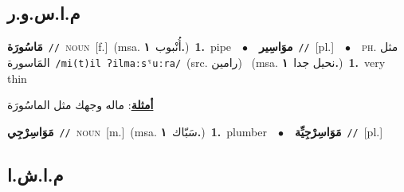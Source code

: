 \documentclass[10pt,a4paper,twoside]{article} %
\begin{document}
\begin{multicols}{2}
\vspace{-3mm}
\subsection*{\color{blue}\foreignlanguage{arabic}{م.ا.س.و.ر}\color{blue}{ (ntws)}} 

{\setlength\topsep{0pt}\textbf{\foreignlanguage{arabic}{مَاسُورَة}}\ {\color{gray}\texttt{//}\color{black}}\ \textsc{noun}\ [f.]\ \color{gray}(msa. \foreignlanguage{arabic}{أُنْبوب}~\foreignlanguage{arabic}{\textbf{١.}})\color{black}\ \textbf{1.}~pipe\ \ $\bullet$\ \ \setlength\topsep{0pt}\textbf{\foreignlanguage{arabic}{موَاسِير}}\ {\color{gray}\texttt{//}\color{black}}\ [pl.]\ \ $\bullet$\ \ \textsc{ph.} \color{gray} \foreignlanguage{arabic}{مثل المَاسورة}\color{black}\ {\color{gray}\texttt{/{\sffamily mi(t)il ʔilmaːsˤuːra}/}\color{black}}\ \color{gray}(src. \foreignlanguage{arabic}{رامين})\color{black}\ \color{gray} (msa. \foreignlanguage{arabic}{نحيل جدا}~\foreignlanguage{arabic}{\textbf{١.}})\color{black}\ \textbf{1.}~very thin\  \begin{flushright}\color{gray}\foreignlanguage{arabic}{\textbf{\underline{\foreignlanguage{arabic}{أمثلة}}}: ماله وجهك مثل الماسُورَة}\end{flushright}\color{black}} \vspace{2mm}

{\setlength\topsep{0pt}\textbf{\foreignlanguage{arabic}{مَوَاسِرْجِي}}\ {\color{gray}\texttt{//}\color{black}}\ \textsc{noun}\ [m.]\ \color{gray}(msa. \foreignlanguage{arabic}{سَبّاك}~\foreignlanguage{arabic}{\textbf{١.}})\color{black}\ \textbf{1.}~plumber\ \ $\bullet$\ \ \setlength\topsep{0pt}\textbf{\foreignlanguage{arabic}{مَوَاسِرْجِيِّة}}\ {\color{gray}\texttt{//}\color{black}}\ [pl.]\ } \vspace{2mm}

\vspace{-3mm}
\subsection*{\color{blue}\foreignlanguage{arabic}{م.ا.ش.ا}\color{blue}{ (ntws)}} 


\end{multicols}
\end{document}
